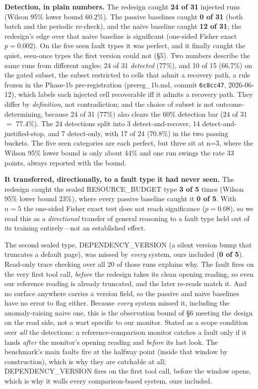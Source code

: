 \documentclass[acmsmall,screen]{acmart}
\begin{document}
\textbf{Detection, in plain numbers.} The redesign caught \textbf{24 of 31}
injected runs (Wilson 95\% lower bound 60.2\%). The passive baselines caught
\textbf{0 of 31} (both batch and the periodic re-check), and the naive baseline
caught \textbf{12 of 31}; the redesign's edge over that naive baseline is
significant (one-sided Fisher exact $p=0.002$). On the five seen fault types it
was perfect, and it finally caught the quiet, seen-once types the first version
could not (\S5). Two numbers describe the same runs from different angles: 24 of
31 \emph{detected} (77\%), and 10 of 15 (66.7\%) on the gated subset, the subset
restricted to cells that admit a recovery path, a rule frozen in the
Phase-1b pre-registration (prereg\_1b.md, commit \texttt{6c8cc47}, 2026-06-12), which
labels each injected cell recoverable iff it admits a recovery path. They differ by \emph{definition}, not contradiction; and the
choice of subset is not outcome-determining, because 24 of 31 (77\%) also clears
the 60\% detection bar (24 of 31 $=$ 77.4\%). The 24 detections split into 3 detect-and-recover, 14
detect-and-justified-stop, and 7 detect-only, with 17 of 24 (70.8\%) in the two
passing buckets. The five seen categories are each perfect, but three sit at
n=3, where the Wilson 95\% lower bound is only about 44\% and one run swings the
rate 33 points, always reported with the bound.

\textbf{It transferred, directionally, to a fault type it had never seen.} The
redesign caught the sealed RESOURCE\_BUDGET type \textbf{3 of 5} times (Wilson
95\% lower bound 23\%), where every passive baseline caught it \textbf{0 of 5}.
With $n=5$ the one-sided Fisher exact test does not reach significance
($p=0.08$), so we read this as a \emph{directional} transfer of general reasoning
to a fault type held out of its training entirely---not an established effect.

The second sealed type, DEPENDENCY\_VERSION (a silent version bump that
truncates a default page), was missed by \emph{every} system, ours included
(\textbf{0 of 5}). Read-only trace checking over all 20 of those runs explains
why. The fault fires on the very first tool call, \emph{before} the redesign
takes its clean opening reading, so even our reference reading is already
truncated, and the later re-reads match it. And no surface anywhere carries a
version field, so the passive and naive baselines have no error to flag either.
Because \emph{every} system missed it, including the anomaly-raising naive
one, this is the observation bound of \S6 meeting the design on the read side,
not a wart specific to our monitor. Stated as a scope condition over \emph{all}
the detections: a reference-comparison monitor catches a fault only if it lands
\emph{after} the monitor's opening reading and \emph{before} its last look. The
benchmark's main faults fire at the halfway point (inside that window by
construction), which is why they are catchable at all; DEPENDENCY\_VERSION fires
on the first tool call, before the window opens, which is why it walls every
comparison-based system, ours included.
\end{document}
